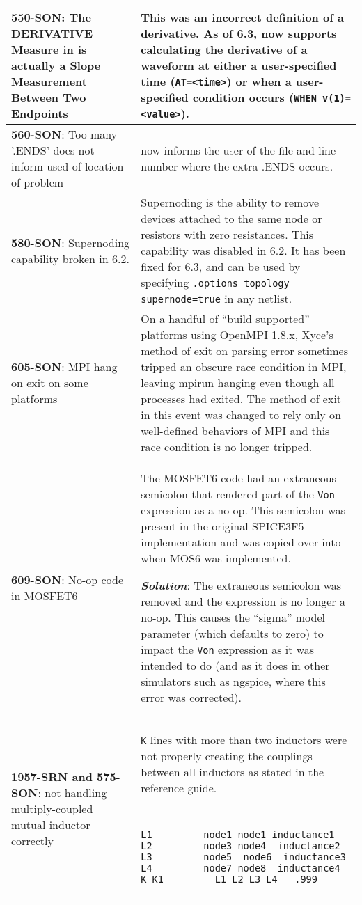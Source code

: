 \begin{longtable}[h] {>{\raggedright\small}m{2in}|>{\raggedright\let\\\tabularnewline\small}m{3.5in}}
\textbf{550-SON}: The DERIVATIVE Measure in \Xyce{} is actually a Slope Measurement Between Two Endpoints &  
This was an incorrect definition of a derivative.  As of \Xyce{} 6.3, 
\Xyce{} now supports calculating the derivative of a waveform at either a 
user-specified time (\texttt {AT=<time>}) or when a user-specified condition occurs 
(\texttt {WHEN v(1)=<value>}). 
\\ \hline
 
\textbf{560-SON}: Too many '.ENDS' does not inform used of location of
problem & \Xyce{} now informs the user of the file and line number where the
extra .ENDS occurs. \\ \hline

\textbf{580-SON}: Supernoding capability broken in \Xyce{} 6.2. &  Supernoding is the ability to remove devices attached to the same node or resistors with zero resistances. This capability was disabled in \Xyce{} 6.2.  It has been fixed for \Xyce{} 6.3, and can be used by specifying \texttt{.options topology supernode=true} in any netlist.\\ \hline

\textbf{605-SON}: MPI hang on exit on some platforms & On a handful of ``build supported'' platforms using OpenMPI 1.8.x, Xyce's method of exit on parsing error sometimes tripped an obscure race condition in MPI, leaving mpirun hanging even though all \Xyce{} processes had exited.  The method of exit in this event was changed to rely only on well-defined behaviors of MPI and this race condition is no longer tripped.
\\ \hline 

\textbf{609-SON}: No-op code in MOSFET6 &   The MOSFET6 code had an extraneous semicolon that rendered part of the \texttt{Von} expression as a no-op.  This semicolon was present in the original SPICE3F5 implementation and was copied over into \Xyce{} when MOS6 was implemented.

\textbf{\textit{Solution}}: The extraneous semicolon was removed and the expression is  no longer a no-op.  This causes the ``sigma'' model parameter (which defaults to zero) to impact the \texttt{Von} expression as it was intended to do (and as it does in other simulators such as ngspice, where this error was corrected).
\\ \hline

\textbf{1957-SRN and 575-SON}: \Xyce{} not handling multiply-coupled mutual inductor correctly &
\texttt{K} lines with more than two inductors were not properly creating the couplings between all inductors as stated in the reference guide.
{\tt
\begin{verbatim}
L1         node1 node1 inductance1
L2         node3 node4  inductance2
L3         node5  node6  inductance3
L4         node7 node8  inductance4
K_K1         L1 L2 L3 L4   .999 
\end{verbatim}
}


\end{longtable}
